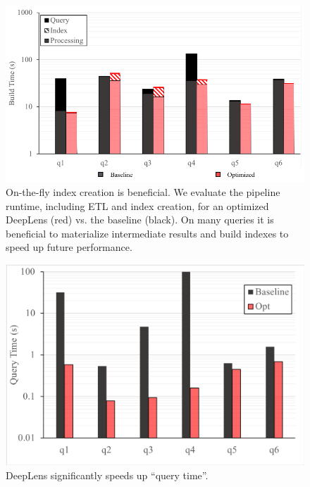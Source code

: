 \begin{figure}[t]
\centering
 \includegraphics[width=\columnwidth]{figures/indexing1.png}
 \caption{On-the-fly index creation is beneficial. We evaluate the pipeline runtime, including ETL and index creation, for an optimized \textsf{DeepLens} (red) vs. the baseline (black). On many queries it is beneficial to materialize intermediate results and build indexes to speed up future performance. \label{index} }
\end{figure}

\begin{figure}[t]
\centering
 \includegraphics[width=\columnwidth]{figures/query.png}
 \caption{\textsf{DeepLens} significantly speeds up ``query time''.  \label{query} }
\end{figure}

